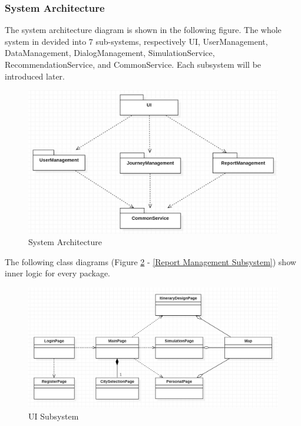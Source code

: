 \documentclass[10pt]{article}
\begin{document}
\subsubsection{System Architecture}
The system architecture diagram is shown in the following figure. The whole system in devided into 7 sub-systems, respectively UI, UserManagement, DataManagement, DialogManagement, SimulationService, RecommendationService, and CommonService. Each subsystem will be introduced later.

\begin{figure}[H]
	\centering
	
	\includegraphics[width=14cm]{architecture.jpg}
	\caption{System Architecture}
	\label{System Architecture}
\end{figure}

The following class diagrams (Figure \ref{UI Subsystem} - \ref{Report Management Subsystem}) show inner logic for every package.

\begin{figure}[H]
    \centering
    
    \includegraphics[width=14cm]{ui.jpg}
    \caption{UI Subsystem}
    \label{UI Subsystem}
\end{figure}
\end{document}
